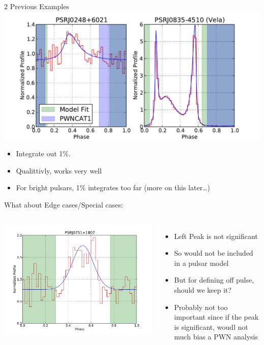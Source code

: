 \documentclass[12pt]{beamer}
\begin{document}
\begin{frame}{2 Previous Examples}
  \includegraphics[width=.85\textwidth]{plots/compare_faint_bright2.pdf}

  \begin{itemize}
    \item Integrate out 1\%. 
    \item Qualittivly, works very well
    \item For bright pulsars, 1\% integrates too far (more on this later\dots)
  \end{itemize}
\end{frame}


\begin{frame}{What about Edge cases/Special cases:}

   \begin{columns}
  \includegraphics[width=1\textwidth]{plots/edge_case.pdf}


  \begin{itemize}
   \item Left Peak is not significant
   \item So would not be included in a pulsar model
   \item But for defining off pulse, should we keep it?
   \item Probably not too important since if the peak is significant, woudl not much bias a PWN analysis
  \end{itemize}
   \end{columns}
\end{frame}
\end{document}
